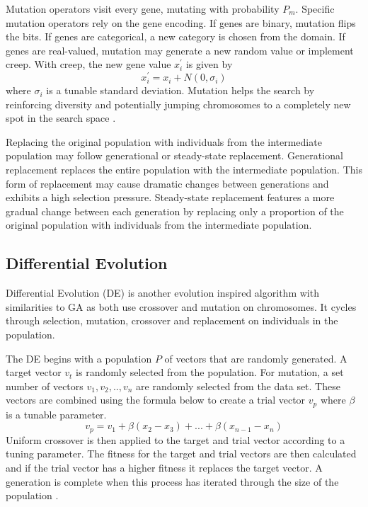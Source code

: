 \documentclass[twoside,11pt]{article}
\begin{document}

	Mutation operators visit every gene, mutating with probability $P_m$. 
	Specific mutation operators rely on the gene encoding. 
	If genes are binary, mutation flips the bits. 
	If genes are categorical, a new category is chosen from the domain. 
	If genes are real-valued, mutation may generate a new random value or implement creep. With creep, the new gene value $x_i^\prime$ is given by
	$$x_i^\prime = x_i + N(0, \sigma_i)$$
	where $\sigma_i$ is a tunable standard deviation. 
	Mutation helps the search by reinforcing diversity and potentially jumping chromosomes to a completely new spot in the search space \citep{ga_tutorial}.

	Replacing the original population with individuals from the intermediate population may follow generational or steady-state replacement. 
	Generational replacement replaces the entire population with the intermediate population. 
	This form of replacement may cause dramatic changes between generations and exhibits a high selection pressure. 
	Steady-state replacement features a more gradual change between each generation by replacing only a proportion of the original population with individuals from the intermediate population.

\subsection{Differential Evolution}
	
	Differential Evolution (DE) is another evolution inspired algorithm with similarities to GA as both use crossover and mutation on chromosomes. 
	It cycles through selection, mutation, crossover and replacement on individuals in the population.
	
	The DE begins with a population $P$ of vectors that are randomly generated. 
	A target vector $v_t$ is randomly selected from the population. 
	For mutation, a set number of vectors $v_1, v_2,.., v_n$ are randomly selected from the data set. 
	These vectors are combined using the formula below to create a trial vector $v_p$ where $\beta$ is a tunable parameter\cite{price2006differential}. $$v_p = v_1 + \beta(x_2 - x_3) + ... + \beta(x_{n-1} - x_n)$$
	Uniform crossover is then applied to the target and trial vector according to a tuning parameter. 
	The fitness for the target and trial vectors are then calculated and if the trial vector has a higher fitness it replaces the target vector. 
	A generation is complete when this process has iterated through the size of the population \cite{price2006differential}.
\end{document}
